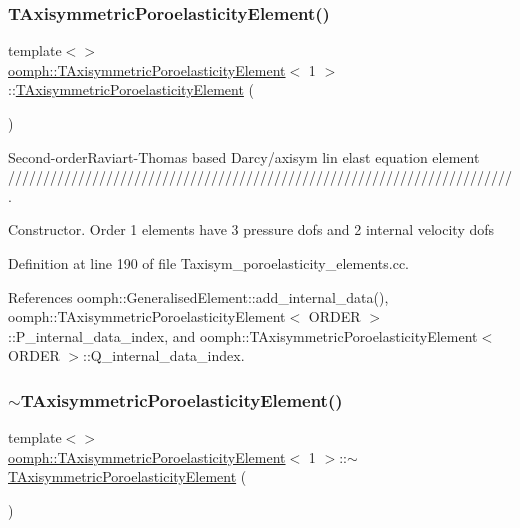 \subsubsection{\texorpdfstring{T\+Axisymmetric\+Poroelasticity\+Element()}{TAxisymmetricPoroelasticityElement()}\hspace{0.1cm}{\footnotesize\ttfamily [3/3]}}
{\footnotesize\ttfamily template$<$$>$ \\
\hyperlink{classoomph_1_1TAxisymmetricPoroelasticityElement}{oomph\+::\+T\+Axisymmetric\+Poroelasticity\+Element}$<$ 1 $>$\+::\hyperlink{classoomph_1_1TAxisymmetricPoroelasticityElement}{T\+Axisymmetric\+Poroelasticity\+Element} (\begin{DoxyParamCaption}{ }\end{DoxyParamCaption})}



Second-\/order\+Raviart-\/\+Thomas based Darcy/axisym lin elast equation element ////////////////////////////////////////////////////////////////////////. 

Constructor. Order 1 elements have 3 pressure dofs and 2 internal velocity dofs 

Definition at line 190 of file Taxisym\+\_\+poroelasticity\+\_\+elements.\+cc.



References oomph\+::\+Generalised\+Element\+::add\+\_\+internal\+\_\+data(), oomph\+::\+T\+Axisymmetric\+Poroelasticity\+Element$<$ O\+R\+D\+E\+R $>$\+::\+P\+\_\+internal\+\_\+data\+\_\+index, and oomph\+::\+T\+Axisymmetric\+Poroelasticity\+Element$<$ O\+R\+D\+E\+R $>$\+::\+Q\+\_\+internal\+\_\+data\+\_\+index.

\mbox{\label{classoomph_1_1TAxisymmetricPoroelasticityElement_abae3970ff40308627b14c0c676698d63}} 
\subsubsection{\texorpdfstring{$\sim$\+T\+Axisymmetric\+Poroelasticity\+Element()}{~TAxisymmetricPoroelasticityElement()}\hspace{0.1cm}{\footnotesize\ttfamily [3/3]}}
{\footnotesize\ttfamily template$<$$>$ \\
\hyperlink{classoomph_1_1TAxisymmetricPoroelasticityElement}{oomph\+::\+T\+Axisymmetric\+Poroelasticity\+Element}$<$ 1 $>$\+::$\sim$\hyperlink{classoomph_1_1TAxisymmetricPoroelasticityElement}{T\+Axisymmetric\+Poroelasticity\+Element} (\begin{DoxyParamCaption}{ }\end{DoxyParamCaption})}



